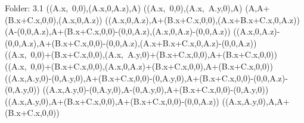 Folder: 3.1
\left(\left(A.x,\ 0,0\right),\left(A.x,0,A.z\right),A\right)
\left(\left(A.x,\ 0,0\right),\left(A.x,\ A.y,0\right),A\right)
\left(A,A+\left(B.x+C.x,0,0\right),\left(A.x,0,A.z\right)\right)
\left(\left(A.x,0,A.z\right),A+\left(B.x+C.x,0,0\right),\left(A.x+B.x+C.x,0,A.z\right)\right)
\left(A-\left(0,0,A.z\right),A+\left(B.x+C.x,0,0\right)-\left(0,0,A.z\right),\left(A.x,0,A.z\right)-\left(0,0,A.z\right)\right)
\left(\left(A.x,0,A.z\right)-\left(0,0,A.z\right),A+\left(B.x+C.x,0,0\right)-\left(0,0,A.z\right),\left(A.x+B.x+C.x,0,A.z\right)-\left(0,0,A.z\right)\right)
\left(\left(A.x,\ 0,0\right)+\left(B.x+C.x,0,0\right),\left(A.x,\ A.y,0\right)+\left(B.x+C.x,0,0\right),A+\left(B.x+C.x,0,0\right)\right)
\left(\left(A.x,\ 0,0\right)+\left(B.x+C.x,0,0\right),\left(A.x,0,A.z\right)+\left(B.x+C.x,0,0\right),A+\left(B.x+C.x,0,0\right)\right)
\left(\left(A.x,A.y,0\right)-\left(0,A.y,0\right),A+\left(B.x+C.x,0,0\right)-\left(0,A.y,0\right),A+\left(B.x+C.x,0,0\right)-\left(0,0,A.z\right)-\left(0,A.y,0\right)\right)
\left(\left(A.x,A.y,0\right)-\left(0,A.y,0\right),A-\left(0,A.y,0\right),A+\left(B.x+C.x,0,0\right)-\left(0,A.y,0\right)\right)
\left(\left(A.x,A.y,0\right),A+\left(B.x+C.x,0,0\right),A+\left(B.x+C.x,0,0\right)-\left(0,0,A.z\right)\right)
\left(\left(A.x,A.y,0\right),A,A+\left(B.x+C.x,0,0\right)\right)


